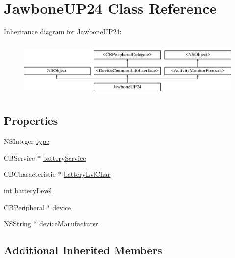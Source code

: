 \hypertarget{interface_jawbone_u_p24}{\section{Jawbone\-U\-P24 Class Reference}
\label{interface_jawbone_u_p24}
}
Inheritance diagram for Jawbone\-U\-P24\-:\begin{figure}[H]
\begin{center}
\leavevmode
\includegraphics[height=2.901554cm]{interface_jawbone_u_p24}
\end{center}
\end{figure}
\subsection*{Properties}
\begin{DoxyCompactItemize}
\item 
N\-S\-Integer \hyperlink{interface_jawbone_u_p24_abd2f3cf19e5f5feeef6be3cf2193acce}{type}
\item 
C\-B\-Service $\ast$ \hyperlink{interface_jawbone_u_p24_a60f0270de3139d5219544969cce08293}{battery\-Service}
\item 
C\-B\-Characteristic $\ast$ \hyperlink{interface_jawbone_u_p24_ac0feafa5d2a26db099b3328df1cc85e1}{battery\-Lvl\-Char}
\item 
int \hyperlink{interface_jawbone_u_p24_a7c1af9ec44bfb9a3fafcf6d3ba1a3dc9}{battery\-Level}
\item 
C\-B\-Peripheral $\ast$ \hyperlink{interface_jawbone_u_p24_a9ed19c4b26f90dfbf9523ba2b7dbf6e0}{device}
\item 
N\-S\-String $\ast$ \hyperlink{interface_jawbone_u_p24_af3f464123aa078ff318eecfba7bbcaf4}{device\-Manufacturer}
\end{DoxyCompactItemize}
\subsection*{Additional Inherited Members}


